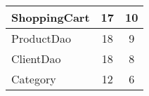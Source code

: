 \begin{table}[!h]
\begin{tabular}{|l|c|c|}
ShoppingCart                                                   & 17                                                                                                    & 10                                                                                              \\ \hline
ProductDao                                                     & 18                                                                                                    & 9                                                                                               \\ \hline
ClientDao                                                      & 18                                                                                                    & 8                                                                                               \\ \hline
Category                                                       & 12                                                                                                    & 6                                                                                               \\ \hline
\end{tabular}
\end{table}